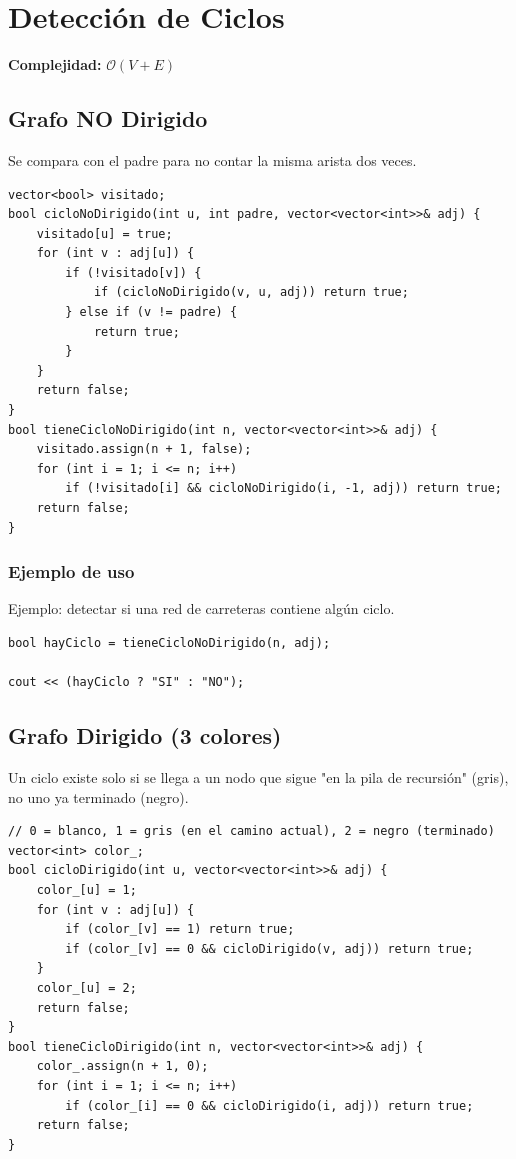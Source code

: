 \documentclass[10pt,twocolumn,letterpaper]{report}
\begin{document}
\section{Detección de Ciclos}
\textbf{Complejidad:} $\mathcal{O}(V + E)$

\subsection{Grafo NO Dirigido}
Se compara con el padre para no contar la misma arista dos veces.
\begin{lstlisting}
vector<bool> visitado;
bool cicloNoDirigido(int u, int padre, vector<vector<int>>& adj) {
    visitado[u] = true;
    for (int v : adj[u]) {
        if (!visitado[v]) {
            if (cicloNoDirigido(v, u, adj)) return true;
        } else if (v != padre) {
            return true;
        }
    }
    return false;
}
bool tieneCicloNoDirigido(int n, vector<vector<int>>& adj) {
    visitado.assign(n + 1, false);
    for (int i = 1; i <= n; i++)
        if (!visitado[i] && cicloNoDirigido(i, -1, adj)) return true;
    return false;
}
\end{lstlisting}
\subsubsection*{Ejemplo de uso}
Ejemplo: detectar si una red de carreteras contiene algún ciclo.
\begin{lstlisting}
bool hayCiclo = tieneCicloNoDirigido(n, adj);

cout << (hayCiclo ? "SI" : "NO");
\end{lstlisting}


\subsection{Grafo Dirigido (3 colores)}
Un ciclo existe solo si se llega a un nodo que sigue "en la pila de recursión" (gris), no uno ya terminado (negro).
\begin{lstlisting}
// 0 = blanco, 1 = gris (en el camino actual), 2 = negro (terminado)
vector<int> color_;
bool cicloDirigido(int u, vector<vector<int>>& adj) {
    color_[u] = 1;
    for (int v : adj[u]) {
        if (color_[v] == 1) return true;
        if (color_[v] == 0 && cicloDirigido(v, adj)) return true;
    }
    color_[u] = 2;
    return false;
}
bool tieneCicloDirigido(int n, vector<vector<int>>& adj) {
    color_.assign(n + 1, 0);
    for (int i = 1; i <= n; i++)
        if (color_[i] == 0 && cicloDirigido(i, adj)) return true;
    return false;
}
\end{lstlisting}
\end{document}
